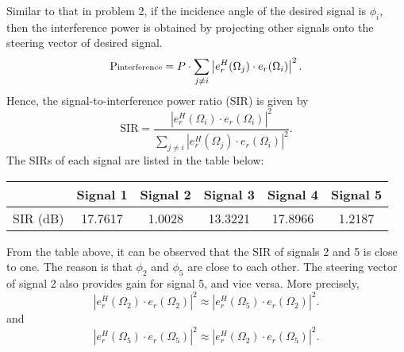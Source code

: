 Similar to that in problem 2, if the incidence angle of the desired signal is $\phi_i$, then the
interference power is obtained by projecting other signals onto the steering vector of desired signal.
\begin{equation*}
    \text{P}{\scriptsize \text{interference}} = P \cdot \sum_{j \neq i} \left|e_r^{H}(\Omega_j) \cdot e_r(\Omega_i)\right|^2.
\end{equation*}
Hence, the signal-to-interference power ratio (SIR) is given by
\begin{equation*}
    \text{SIR} = \frac{\left|e_r^{H}(\Omega_i) \cdot e_r(\Omega_i)\right|^2}{\sum_{j \neq i} \left|e_r^{H}(\Omega_j) \cdot e_r(\Omega_i)\right|^2}.
\end{equation*}
The SIRs of each signal are listed in the table below:
\begin{table}[H]
    \centering
    \begin{tabular}{c|c|c|c|c|c}
             & Signal 1 & Signal 2 & Signal 3 & Signal 4 & Signal 5 \\
    \hline
    SIR (dB) & 17.7617 & 1.0028 & 13.3221 & 17.8966 & 1.2187
    \end{tabular}
\end{table}
From the table above, it can be observed that the SIR of signals 2 and 5 is close to one.
The reason is that $\phi_2$ and $\phi_5$ are close to each other. The steering vector of signal 2
also provides gain for signal 5, and vice versa. More precisely,
\begin{equation*}
    \left|e_r^{H}(\Omega_2) \cdot e_r(\Omega_2)\right|^2 \approx \left|e_r^{H}(\Omega_5) \cdot e_r(\Omega_2)\right|^2.
\end{equation*}
and
\begin{equation*}
    \left|e_r^{H}(\Omega_5) \cdot e_r(\Omega_5)\right|^2 \approx \left|e_r^{H}(\Omega_2) \cdot e_r(\Omega_5)\right|^2.
\end{equation*}